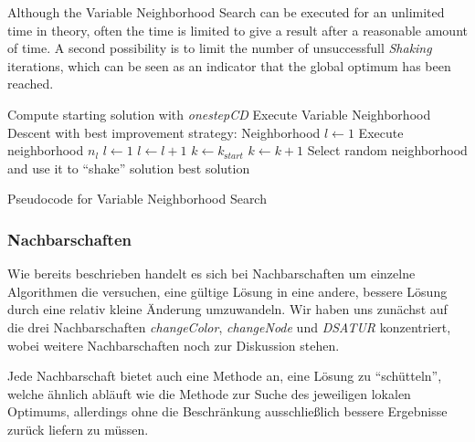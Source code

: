 \documentclass[paper=a4,fontsize=12pt]{scrartcl}
\begin{document}
{Although the Variable Neighborhood Search can be executed for an unlimited time in theory, often the time is limited to give a result after a reasonable amount of time. A second possibility is to limit the number of unsuccessfull \emph{Shaking} iterations, which can be seen as an indicator that the global optimum has been reached.


\begin{algorithm}
\begin{algorithmic}[1]
\State Compute starting solution with \emph{onestepCD}
\State Execute Variable Neighborhood Descent with best improvement strategy:
\State Neighborhood $l \leftarrow 1$
\State Execute neighborhood $n_l$
\State  $l\leftarrow 1$  
\Else
\State  $l\leftarrow l + 1$
\EndIf
\EndWhile
{}
\State $k \leftarrow k_{\mathrm start}$ 
\Else
\State $k \leftarrow k + 1$
\EndIf
\State Select random neighborhood and use it to ``shake'' solution
\EndWhile
\State\Return best solution
\end{algorithmic}
\caption{Pseudocode for Variable Neighborhood Search}
\end{algorithm}
}

\subsubsection{Nachbarschaften}
\label{sec:neigh}
Wie bereits beschrieben handelt es sich bei Nachbarschaften um einzelne Algorithmen die versuchen, eine gültige Lösung in eine andere, bessere Lösung durch eine relativ kleine Änderung umzuwandeln. Wir haben uns zunächst auf die drei Nachbarschaften \emph{changeColor}, \emph{changeNode} und \emph{DSATUR} konzentriert, wobei weitere Nachbarschaften noch zur Diskussion stehen.

Jede Nachbarschaft bietet auch eine Methode an, eine Lösung zu ``schütteln'', welche ähnlich abläuft wie die Methode zur Suche des jeweiligen lokalen Optimums, allerdings ohne die Beschränkung ausschließlich bessere Ergebnisse zurück liefern zu müssen.
\end{document}
